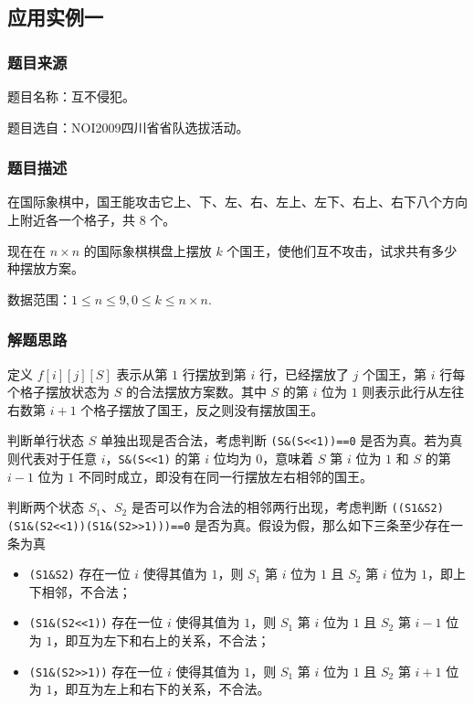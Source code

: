 \documentclass[a4paper, UTF8]{ctexart}
\begin{document}
\subsection{应用实例一}

\subsubsection{题目来源}

题目名称：互不侵犯。

题目选自：NOI2009四川省省队选拔活动。

\subsubsection{题目描述}

在国际象棋中，国王能攻击它上、下、左、右、左上、左下、右上、右下八个方向上附近各一个格子，共
\(8\) 个。

现在在 \(n\times n\) 的国际象棋棋盘上摆放 \(k\)
个国王，使他们互不攻击，试求共有多少种摆放方案。

数据范围：\(1\le n\le 9,0\le k\le n\times n\).

\subsubsection{解题思路}

定义 \(f[i][j][S]\) 表示从第 \(1\) 行摆放到第 \(i\) 行，已经摆放了 \(j\)
个国王，第 \(i\) 行每个格子摆放状态为 \(S\) 的合法摆放方案数。其中 \(S\)
的第 \(i\) 位为 \(1\) 则表示此行从左往右数第 \(i+1\)
个格子摆放了国王，反之则没有摆放国王。

判断单行状态 \(S\) 单独出现是否合法，考虑判断
\texttt{(S\&(S\textless{}\textless{}1))==0}
是否为真。若为真则代表对于任意
\(i\)，\texttt{S\&(S\textless{}\textless{}1)} 的第 \(i\) 位均为
\(0\)，意味着 \(S\) 第 \(i\) 位为 \(1\) 和 \(S\) 的第 \(i-1\) 位为 \(1\)
不同时成立，即没有在同一行摆放左右相邻的国王。

判断两个状态 \(S_1\)、\(S_2\) 是否可以作为合法的相邻两行出现，考虑判断
\texttt{((S1\&S2)\textbar{}\textbar{}(S1\&(S2\textless{}\textless{}1))\textbar{}\textbar{}(S1\&(S2\textgreater{}\textgreater{}1)))==0}
是否为真。假设为假，那么如下三条至少存在一条为真

\begin{itemize}
\tightlist
\item
  \texttt{(S1\&S2)} 存在一位 \(i\) 使得其值为 \(1\)，则 \(S_1\) 第 \(i\)
  位为 \(1\) 且 \(S_2\) 第 \(i\) 位为 \(1\)，即上下相邻，不合法；
\item
  \texttt{(S1\&(S2\textless{}\textless{}1))} 存在一位 \(i\) 使得其值为
  \(1\)，则 \(S_1\) 第 \(i\) 位为 \(1\) 且 \(S_2\) 第 \(i-1\) 位为
  \(1\)，即互为左下和右上的关系，不合法；
\item
  \texttt{(S1\&(S2\textgreater{}\textgreater{}1))} 存在一位 \(i\)
  使得其值为 \(1\)，则 \(S_1\) 第 \(i\) 位为 \(1\) 且 \(S_2\) 第 \(i+1\)
  位为 \(1\)，即互为左上和右下的关系，不合法。
\end{itemize}
\end{document}
